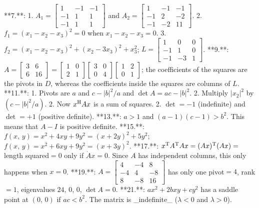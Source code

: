

**7.**: 1. \(A_{1}=\begin{bmatrix}1&-1&-1\\ -1&1&1\\ -1&1&1\end{bmatrix}\) and \(A_{2}=\begin{bmatrix}1&-1&-1\\ -1&2&-2\\ -1&-2&11\end{bmatrix}\).
2. \(f_{1}=(x_{1}-x_{2}-x_{3})^{2}=0\) when \(x_{1}-x_{2}-x_{3}=0\).
3. \(f_{2}=(x_{1}-x_{2}-x_{3})^{2}+(x_{2}-3x_{3})^{2}+x_{3}^{2}\); \(L=\begin{bmatrix}1&0&0\\ -1&1&0\\ -1&-3&1\end{bmatrix}\).
**9.**: \(A=\begin{bmatrix}3&6\\ 6&16\end{bmatrix}=\begin{bmatrix}1&0\\ 2&1\end{bmatrix}\begin{bmatrix}3&0\\ 0&4\end{bmatrix}\begin{bmatrix}1&2\\ 0&1\end{bmatrix}\); the coefficients of the squares are the pivots in \(D\), whereas the coefficients inside the squares are columns of \(L\).
**11.**: 1. Pivots are \(a\) and \(c-|b|^{2}/a\) and \(\det A=ac-|b|^{2}\). 2. Multiply \(|x_{2}|^{2}\) by \((c-|b|^{2}/a)\). 2. Now \(x^{\rm H}Ax\) is a sum of squares. 2. \(\det=-1\) (indefinite) and \(\det=+1\) (positive definite).
**13.**: \(a>1\) and \((a-1)(c-1)>b^{2}\). This means that \(A-I\) is positive definite.
**15.**: \(f(x,\,y)=x^{2}+4xy+9y^{2}=(x+2y)^{2}+5y^{2}\); \(f(x,\,y)=x^{2}+6xy+9y^{2}=(x+3y)^{2}\).
**17.**: \(x^{\rm T}A^{\rm T}Ax=(Ax)^{\rm T}(Ax)=\) length squared\(=0\) only if \(\dot{A}x=0\). Since \(A\) has independent columns, this only happens when \(x=0\).
**19.**: \(A=\begin{bmatrix}4&-4&8\\ -4&4&-8\\ 8&-8&16\end{bmatrix}\) has only one pivot\(=4\), rank\(=1\), eigenvalues \(24\), \(0\), \(0\), \(\det A=0\).
**21.**: \(ax^{2}+2bxy+cy^{2}\) has a saddle point at \((0,\,0)\) if \(ac<b^{2}\). The matrix is _indefinite_ (\(\lambda<0\) and \(\lambda>0\)).

